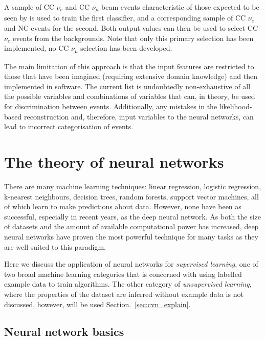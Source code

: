 A sample of CC $\nu_{e}$ and CC $\nu_{\mu}$ beam events characteristic of those expected to be
seen by \chips is used to train the first classifier, and a corresponding sample of CC $\nu_{e}$
and NC events for the second. Both output values can then be used to select CC $\nu_{e}$ events
from the backgrounds. Note that only this primary selection has been implemented, no CC
$\nu_{\mu}$ selection has been developed.

The main limitation of this approach is that the input features are restricted to those that have
been imagined (requiring extensive domain knowledge) and then implemented in software. The current
list is undoubtedly non-exhaustive of all the possible variables and combinations of variables
that can, in theory, be used for discrimination between events. Additionally, any mistakes in the
likelihood-based reconstruction and, therefore, input variables to the neural networks, can lead
to incorrect categorisation of events.

\section{The theory of neural networks} %
\label{sec:cvn_theory} %

There are many machine learning techniques: linear regression, logistic regression, k-nearest
neighbours, decision trees, random forests, support vector machines, all of which learn to make
predictions about data. However, none have been as successful, especially in recent years, as the
deep neural network. As both the size of datasets and the amount of available computational power
has increased, deep neural networks have proven the most powerful technique for many tasks as they
are well suited to this paradigm.

Here we discuss the application of neural networks for \emph{supervised learning}, one of two
broad machine learning categories that is concerned with using labelled example data to train
algorithms. The other category of \emph{unsupervised learning}, where the properties of the
dataset are inferred without example data is not discussed, however, will be used
Section.~\ref{sec:cvn_explain}.

\subsection{Neural network basics} %
\label{sec:cvn_theory_basics} %


